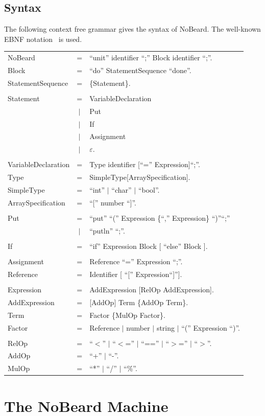 \documentclass[11pt]{report}
\newcommand{\leongage}{NoBeard}
\newcommand{\emptystring}{$\varepsilon$}
\newenvironment{grammar}
	{	\begin{tabular}{p{.25\textwidth} c p{.75\textwidth}}
	}
	{	\end{tabular}
	}
\newcommand{\completerule}[2]{#1 & = & #2.\\}
\newcommand{\startrule}[2]{#1 & = & #2\\}
\newcommand{\alternativerule}[1]{ & $|$ & #1\\}
\newcommand{\alternativeend}[1]{ & $|$ & #1.\\}
\begin{document}
\section{Syntax}
The following context free grammar gives the syntax of \leongage{}. The well-known EBNF notation~\cite{wirth_what_1977} is used.

	\begin{grammar}
		\completerule{NoBeard}{``unit'' identifier ``;'' Block identifier ``;''}

		\completerule{Block}{``do'' StatementSequence ``done''}

		\completerule{StatementSequence}{\{Statement\}}
		\\

		\startrule{Statement}{VariableDeclaration}
		\alternativerule{Put}
		\alternativerule{If}
		\alternativerule{Assignment}
		\alternativeend{\emptystring}
		\\
		\completerule{VariableDeclaration}{Type identifier [``='' Expression]``;''}
		\completerule{Type}{SimpleType[ArraySpecification]}
		\completerule{SimpleType}{``int'' $|$ ``char'' $|$ ``bool''}
		\completerule{ArraySpecification}{``['' number ``]''}
		\\
		\startrule{Put}{``put'' ``('' Expression \{``,'' Expression\} ``)''``;''}
		\alternativeend{``putln'' ``;''}
		\\
		\completerule{If}{``if'' Expression Block [ ``else'' Block ]}
		\\
		\completerule{Assignment}{Reference ``='' Expression ``;''}
		\completerule{Reference}{Identifier [ ``['' Expression``]'']}
		\\
		\completerule{Expression}{AddExpression [RelOp AddExpression]}
		\completerule{AddExpression}{[AddOp] Term \{AddOp Term\}}
		\completerule{Term}{Factor \{MulOp Factor\}}
		\completerule{Factor}{Reference $|$ number $|$ string $|$ ``('' Expression ``)''}
		\\
		\completerule{RelOp}{``$<$'' $|$ ``$<$='' $|$ ``=='' $|$ ``$>$='' $|$ ``$>$''}
		\completerule{AddOp}{``+'' $|$ ``-''}
		\completerule{MulOp}{``*'' $|$ ``/'' $|$ ``\%''}	
	\end{grammar}

\chapter{The \leongage{} Machine}
\lstset{language=AsmDef}
\end{document}
